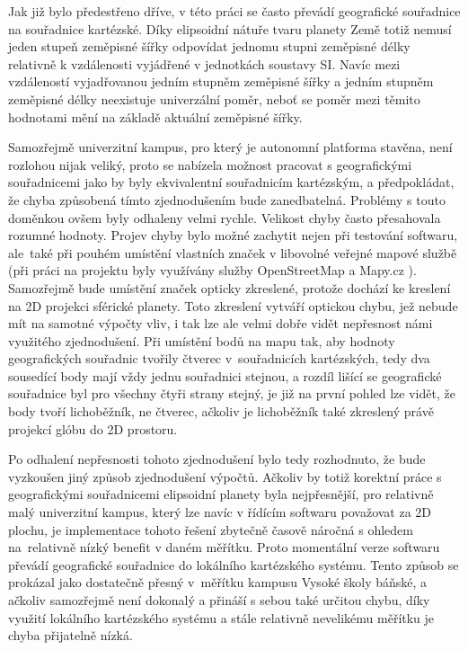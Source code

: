 \documentclass[czech, bachelor]{diploma}
\begin{document}
Jak již bylo předestřeno dříve, v této práci se často převádí geografické souřadnice na souřadnice kartézské. Díky elipsoidní
nátuře tvaru planety Země totiž nemusí jeden stupeň zeměpisné šířky odpovídat jednomu stupni zeměpisné délky relativně
k vzdálenosti vyjádřené v jednotkách soustavy SI. Navíc mezi vzdáleností vyjadřovanou jedním stupněm zeměpisné šířky a jedním
stupněm zeměpisné délky neexistuje univerzální poměr, neboť se poměr mezi těmito hodnotami mění na základě aktuální zeměpisné
šířky.

Samozřejmě univerzitní kampus, pro který je autonomní platforma stavěna, není rozlohou nijak veliký, proto se nabízela možnost
pracovat s geografickými souřadnicemi jako by byly ekvivalentní souřadnicím kartézským, a předpokládat, že chyba způsobená tímto
zjednodušením bude zanedbatelná. Problémy s touto doměnkou ovšem byly odhaleny velmi rychle. Velikost chyby často přesahovala
rozumné hodnoty. Projev chyby bylo možné zachytit nejen při testování softwaru, ale~také při pouhém umístění vlastních značek
v libovolné veřejné mapové službě (při práci na projektu byly využívány služby OpenStreetMap \cite{openstreetmap-source} a
Mapy.cz \cite{mapycz-source}). Samozřejmě bude umístění značek opticky zkreslené, protože dochází ke kreslení na 2D projekci
sférické planety. Toto zkreslení vytváří optickou chybu, jež nebude mít na samotné výpočty vliv, i tak lze ale velmi dobře vidět
nepřesnost námi využitého zjednodušení. Při umístění bodů na mapu tak, aby hodnoty geografických souřadnic tvořily čtverec
v~souřadnicích kartézských, tedy dva sousedící body mají vždy jednu souřadnici stejnou, a rozdíl lišící se geografické souřadnice
byl pro všechny čtyři strany stejný, je již na první pohled lze vidět, že body tvoří lichoběžník, ne čtverec, ačkoliv
je lichoběžník také zkreslený právě projekcí glóbu do 2D prostoru.

Po odhalení nepřesnosti tohoto zjednodušení bylo tedy rozhodnuto, že bude vyzkoušen jiný způsob zjednodušení výpočtů. Ačkoliv by
totiž korektní práce s geografickými souřadnicemi elipsoidní planety byla nejpřesnější, pro relativně malý univerzitní kampus,
který lze navíc v řídícím softwaru považovat za 2D plochu, je implementace tohoto řešení zbytečně časově náročná s ohledem
na~relativně nízký benefit v daném měřítku. Proto momentální verze softwaru převádí geografické souřadnice do lokálního
kartézského systému. Tento způsob se prokázal jako dostatečně přesný v~měřítku kampusu Vysoké školy báňské, a ačkoliv samozřejmě
není dokonalý a přináší s sebou také určitou chybu, díky využití lokálního kartézského systému a stále relativně nevelikému
měřítku je chyba přijatelně nízká.
\end{document}
